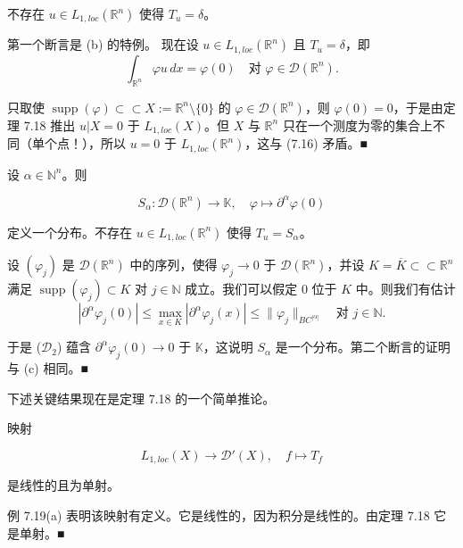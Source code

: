 \begin{example}
\begin{items}
不存在 $ u \in L_{1,loc}(\mathbb{R}^{n}) $ 使得 $ T_{u} = \delta $。

\proofhead
第一个断言是 (b) 的特例。
现在设 $ u \in L_{1,loc}(\mathbb{R}^{n}) $ 且 $ T_{u} = \delta $，即
\begin{equation}
\int_{\mathbb{R}^{n}}\varphi u\,dx = \varphi(0) \quad \text{对 } \varphi \in \mathcal{D}(\mathbb{R}^{n}) .\tag{7.16}
\end{equation}

只取使 $ \operatorname{supp}(\varphi) \subset\subset X := \mathbb{R}^{n} \setminus \{0\} $ 的 $ \varphi \in \mathcal{D}(\mathbb{R}^{n}) $，则 $ \varphi(0) = 0 $，于是由定理 7.18 推出 $ u|X = 0 $ 于 $ L_{1,loc}(X) $。但 $ X $ 与 $ \mathbb{R}^{n} $ 只在一个测度为零的集合上不同（单个点！），所以 $ u = 0 $ 于 $ L_{1,loc}(\mathbb{R}^{n}) $，这与 (7.16) 矛盾。\nobreak\hspace{0.35em}■

\item

设 $ \alpha \in \mathbb{N}^{n} $。则

\[
S_{\alpha} : \mathcal{D}(\mathbb{R}^{n}) \to \mathbb{K} , \quad \varphi \mapsto \partial^{\alpha}\varphi(0)
\]

定义一个分布。不存在 $ u \in L_{1,loc}(\mathbb{R}^{n}) $ 使得 $ T_{u} = S_{\alpha} $。

\proofhead
设 $ (\varphi_{j}) $ 是 $ \mathcal{D}(\mathbb{R}^{n}) $ 中的序列，使得 $ \varphi_{j} \to 0 $ 于 $ \mathcal{D}(\mathbb{R}^{n}) $，并设 $ K = \overline{K} \subset\subset \mathbb{R}^{n} $ 满足 $ \operatorname{supp}(\varphi_{j}) \subset K $ 对 $ j \in \mathbb{N} $ 成立。我们可以假定 0 位于 $ K $ 中。则我们有估计
\[
|\partial^{\alpha}\varphi_{j}(0)| \le \max_{x\in K}|\partial^{\alpha}\varphi_{j}(x)| \le \|\varphi_{j}\|_{BC^{|\alpha|}} \quad \text{对 } j \in \mathbb{N} .
\]

于是 ($ \mathcal{D}_{2} $) 蕴含 $ \partial^{\alpha}\varphi_{j}(0) \to 0 $ 于 $ \mathbb{K} $，这说明 $ S_{\alpha} $ 是一个分布。第二个断言的证明与 (c) 相同。\nobreak\hspace{0.35em}■

\end{items}

下述关键结果现在是定理 7.18 的一个简单推论。

\end{example}

\begin{theorem}

映射

\[
L_{1,loc}(X) \to \mathcal{D}'(X) , \quad f \mapsto T_{f}
\]

是线性的且为单射。

\proofhead
例 7.19(a) 表明该映射有定义。它是线性的，因为积分是线性的。由定理 7.18 它是单射。\nobreak\hspace{0.35em}■
\end{theorem}

